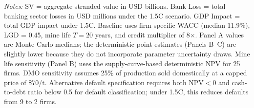 \begin{table}[htbp]
\smallskip
\noindent \textit{Notes:} SV = aggregate stranded value in USD billions. Bank Loss = total banking sector losses in USD millions under the 1.5\textdegree{}C scenario. GDP Impact = total GDP impact under 1.5\textdegree{}C. Baseline uses firm-specific WACC (median 11.9\%), LGD = 0.45, mine life $T = 20$ years, and credit multiplier of 8$\times$. Panel A values are Monte Carlo medians; the deterministic point estimates (Panels B--C) are slightly lower because they do not incorporate parameter uncertainty draws. Mine life sensitivity (Panel B) uses the supply-curve-based deterministic NPV for 25 firms. DMO sensitivity assumes 25\% of production sold domestically at a capped price of \$70/t. Alternative default specification requires both NPV$<$0 and cash-to-debt ratio below 0.5 for default classification; under 1.5\textdegree{}C, this reduces defaults from 9 to 2 firms.
\end{table}
